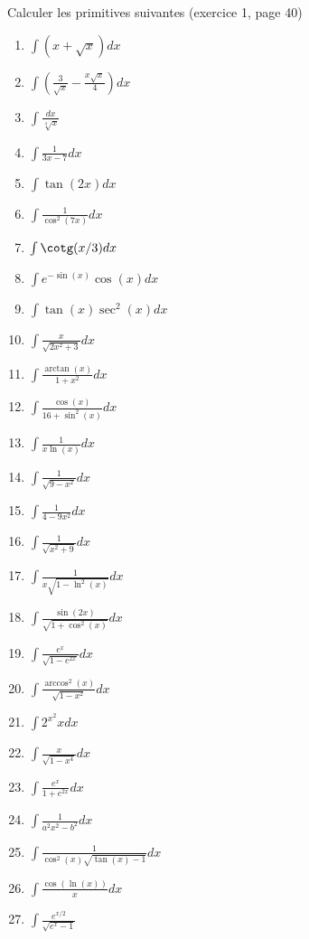\begin{exercice}\label{exoGeneral0017}

Calculer les primitives suivantes (exercice 1, page 40)
\renewcommand{\theenumi}{\arabic{enumi}}
\begin{multicols}{3}
\begin{enumerate}
\item
$\int (x+\sqrt{x})dx$
\item
$\int \left( \frac{ 3 }{ \sqrt{x} }-\frac{ x\sqrt{x} }{ 4 } \right) dx$
\item
$\int \frac{ dx }{ \sqrt[4]{x} }$
\item
$\int \frac{1}{ 3x-7 } dx$
\item
$\int \tan(2x) dx$
\item
$\int \frac{1}{ \cos^2(7x) } dx$
\item
$\int \cotg(x/3) dx$
\item
$\int  e^{-\sin(x)}\cos(x) dx$
\item
$\int \tan(x)\sec^2(x) dx$
\item
$\int \frac{ x }{ \sqrt{2x^2+3} } dx$
\item
$\int \frac{ \arctan(x) }{ 1+x^2 } dx$
\item
$\int \frac{ \cos(x) }{ 16+\sin^2(x) } dx$
\item
$\int \frac{1}{ x\ln(x) } dx$
\item
$\int \frac{1}{ \sqrt{9-x^2} } dx$
\item
$\int \frac{1}{ 4-9x^2 } dx$
\item
$\int \frac{1}{ \sqrt{x^2+9} } dx$
\item
$\int \frac{ 1 }{ x\sqrt{1-\ln^2(x)} } dx$
\item
$\int \frac{ \sin(2x) }{ \sqrt{1+\cos^2(x)} } dx$
\item
$\int \frac{ e^x }{ \sqrt{1- e^{2x}} } dx$
\item
$\int \frac{ \arccos^2(x) }{ \sqrt{1-x^2} } dx$
\item
$\int 2^{x^2}x dx$
\item
$\int \frac{ x }{ \sqrt{1-x^4} } dx$
\item
$\int \frac{ e^x }{ 1+ e^{2x} } dx$
\item
$\int \frac{1}{ a^2x^2-b^2 } dx$
\item
$\int \frac{1}{ \cos^2(x)\sqrt{\tan(x)-1} } dx$
\item
$\int \frac{ \cos(\ln(x))}{ x } dx$
\item
$\int \frac{  e^{x/2} }{ \sqrt{e^x-1} }$


\end{enumerate}
\end{multicols}
\end{exercice}
